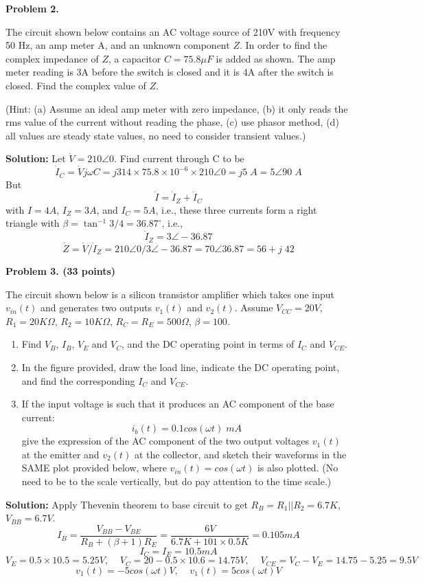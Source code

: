 \item {\bf Problem 2.}

The circuit shown below contains an AC voltage source of 210V with frequency
50 Hz, an amp meter A, and an unknown component $Z$. In order to find the 
complex impedance of $Z$, a capacitor $C=75.8\mu F$ is added as shown. The 
amp meter reading is 3A before the switch is closed and it is 4A after the
switch is closed. Find the complex value of $Z$.

(Hint: (a) Assume an ideal amp meter with zero impedance, (b) it only reads 
the rms value of the current without reading the phase, (c) use phasor method,
(d) all values are steady state values, no need to consider transient values.)


{\bf Solution:}
Let $\dot{V}=210\angle 0$. Find current through C to be
\[ \dot{I}_C=\dot{V} j\omega C=j314\times 75.8\times 10^{-6}\times 210\angle 0
=j5\;A=5\angle 90\;A \]
But
\[ \dot{I}=\dot{I}_Z+\dot{I}_C \]
with $I=4A$, $I_Z=3A$, and $I_C=5A$, i.e., these three currents form a 
right triangle with $\beta=\tan^{-1} 3/4=36.87^\circ$, i.e.,
\[ \dot{I}_Z=3\angle -36.87 \]
\[ \dot{Z}=\dot{V}/\dot{I}_Z=210\angle 0/3\angle -36.87 =70\angle 36.87
=56+j\;42\]


\item {\bf Problem 3. (33 points)} 


The circuit shown below is a silicon transistor amplifier which takes one
input $v_{in}(t)$ and generates two outputs $v_1(t)$ and $v_2(t)$. Assume 
$V_{CC}=20V$, $R_1=20K\Omega$, $R_2=10K\Omega$, $R_C=R_E=500\Omega$, $\beta=100$. 

\begin{enumerate}
\item Find $V_B$, $I_B$, $V_E$ and $V_C$, and the DC operating point in 
terms of $I_C$ and $V_{CE}$. 
\item In the figure provided, draw the load line, indicate the DC operating 
point, and find the corresponding $I_C$ and $V_{CE}$.
\item If the input voltage is such that it produces an AC component of the 
base current:
\[	i_b(t)=0.1 cos(\omega t) \; mA	\]
give the expression of the AC component of the two output voltages $v_1(t)$ 
at the emitter and $v_2(t)$ at the collector, and sketch their waveforms in 
the SAME plot provided below, where $v_{in}(t)=cos(\omega t)$ is also plotted.
(No need to be to the scale vertically, but do pay attention to the time
scale.)
\end{enumerate}


{\bf Solution:} 
Apply Thevenin theorem to base circuit to get $R_B=R_1 || R_2=6.7K$, $V_{BB}=6.7V$.
\[ I_B=\frac{V_{BB}-V_{BE}}{R_B+(\beta+1)R_E}=\frac{6V}{6.7K+101\times 0.5K}
	=0.105 mA \]
\[ I_C=I_E=10.5 mA \]
\[ V_E=0.5\times 10.5=5.25V,\;\;\;\; V_C=20-0.5\times 10.6=14.75V,\;\;\;\;
	V_{CE}=V_C-V_E=14.75-5.25=9.5V \]
\[ v_1(t)=-5 cos(\omega t) V,\;\;\;\;v_1(t)=5 cos(\omega t) V	\]


